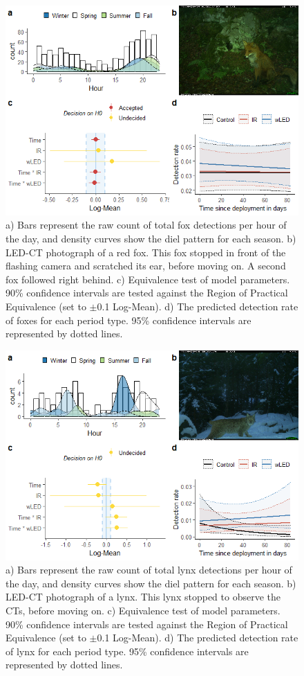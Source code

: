 \begin{figure}
		  \centering
	\includegraphics[width=13cm]{../R/glmm_sp_files/figure-html/rev2-1.png}
\caption[Red fox]
{\footnotesize
	a) Bars represent the raw count of total fox detections per hour of the day, and density curves show the diel pattern for each season.
	b) LED-CT photograph of a red fox. This fox stopped in front of the flashing camera and scratched its ear, before moving on. A second fox followed right behind.
	c) Equivalence test of model parameters. 90\% confidence intervals are tested against the Region of Practical Equivalence (set to $\pm$0.1 Log-Mean).
	d) The predicted detection rate of foxes for each period type. 95\% confidence intervals are represented by dotted lines.}
\label{rev}
\end{figure}

\begin{figure}
	\centering
	\includegraphics[width=13cm]{../R/glmm_sp_files/figure-html/gaupe2-1.png}
	\caption[Lynx]
	{\footnotesize
		a) Bars represent the raw count of total lynx detections per hour of the day, and density curves show the diel pattern for each season.
		b) LED-CT photograph of a lynx. This lynx stopped to observe the CTs, before moving on.
		c) Equivalence test of model parameters. 90\% confidence intervals are tested against the Region of Practical Equivalence (set to $\pm$0.1 Log-Mean). 
		d) The predicted detection rate of lynx for each period type. 95\% confidence intervals are represented by dotted lines.}
	\label{gaupe}
\end{figure}

